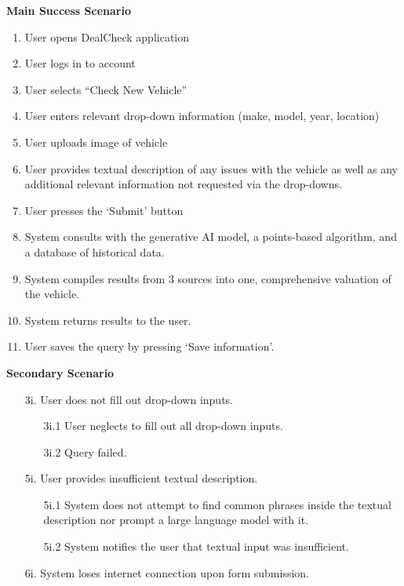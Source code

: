 \documentclass[]{article}
\begin{document}
\begin{enumerate}[{\bf {BE}1.}]
	{\bf Main Success Scenario}
		\begin{enumerate}[1.]
			\item User opens DealCheck application
			\item User logs in to account
			\item User selects “Check New Vehicle”
			\item User enters relevant drop-down information (make, model, year, location)
			\item User uploads image of vehicle
			\item User provides textual description of any issues with the vehicle as well as any additional relevant information not requested via the drop-downs.
			\item User presses the ‘Submit’ button
			\item System consults with the generative AI model, a points-based algorithm, and a database of historical data.
			\item System compiles results from 3 sources into one, comprehensive valuation of the vehicle.
			\item System returns results to the user.
			\item User saves the query by pressing ‘Save information’.
		\end{enumerate}
		{\bf Secondary Scenario} \\
            \begin{enumerate}
                \item [3i.] User does not fill out drop-down inputs.
    		\begin{enumerate}
    			\item [3i.1] User neglects to fill out all drop-down inputs.
    			\item [3i.2] Query failed.
    		\end{enumerate}
    		\item [5i.] User provides insufficient textual description.
    		\begin{enumerate}
    			\item [5i.1] System does not attempt to find common phrases inside the textual description nor prompt a large language model with it.
    			\item [5i.2] System notifies the user that textual input was insufficient.
    		\end{enumerate}
    		\item [6i.] System loses internet connection upon form submission.
    		\begin{enumerate}

\end{enumerate}
\end{enumerate}
\end{enumerate}
\end{document}
